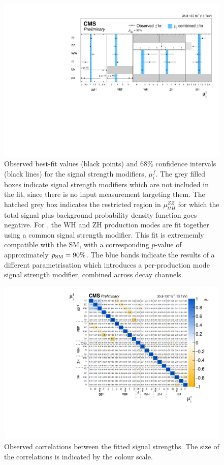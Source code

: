 \begin{figure}[htb!]
  \centering
  \includegraphics[width=1\textwidth]{Figures/eft/combination_mu.pdf}
  \caption[Results of the combination signal strength fit]
  {
    Observed best-fit values (black points) and 68\% confidence intervals (black lines) for the signal strength modifiers, $\mu_i^f$. The grey filled boxes indicate signal strength modifiers which are not included in the fit, since there is no input measurement targeting them. The hatched grey box indicates the restricted region in $\mu^{ZZ}_{ttH}$ for which the total signal plus background probability density function goes negative. For \HZZ, the WH and ZH production modes are fit together using a common signal strength modifier. This fit is extrememly compatible with the SM, with a corresponding $p$-value of approximately $p_{\rm{SM}}=90\%$. The blue bands indicate the results of a different parametrisation which introduces a per-production mode signal strength modifier, combined across decay channels. 
  }
  \label{fig:combination_mu}
\end{figure}

\begin{figure}[htb!]
  \centering
  \includegraphics[width=1\textwidth]{Figures/eft/combination_mu_corr.pdf}
  \caption[Correlations in the combination signal strength fit]
  {
    Observed correlations between the fitted signal strengths. The size of the correlations is indicated by the colour scale.
  }
  \label{fig:combination_mu_corr}
\end{figure}

